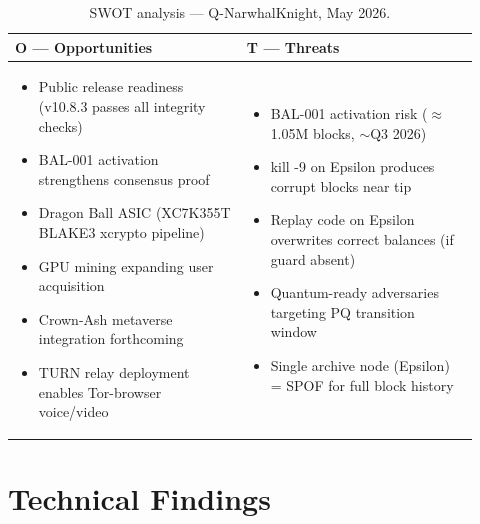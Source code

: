 \documentclass[12pt,a4paper]{article}
\begin{document}
\begin{table}[H]
\begin{tabular}{|p{0.46\linewidth}|p{0.46\linewidth}|}
\hline
\cellcolor{swotO}\textcolor{qblue}{\bfseries \large O — Opportunities} &
\cellcolor{swotT}\textcolor{qorange}{\bfseries \large T — Threats} \\
\hline
\begin{minipage}[t]{0.43\linewidth}\vspace{3pt}
\begin{itemize}[leftmargin=*,topsep=0pt,itemsep=1pt,parsep=0pt]
  \item Public release readiness (v10.8.3 passes all integrity checks)
  \item BAL-001 activation strengthens consensus proof
  \item Dragon Ball ASIC (XC7K355T BLAKE3 xcrypto pipeline)
  \item GPU mining expanding user acquisition
  \item Crown-Ash metaverse integration forthcoming
  \item TURN relay deployment enables Tor-browser voice/video
\end{itemize}\vspace{3pt}
\end{minipage} &
\begin{minipage}[t]{0.43\linewidth}\vspace{3pt}
\begin{itemize}[leftmargin=*,topsep=0pt,itemsep=1pt,parsep=0pt]
  \item BAL-001 activation risk ($\approx$1.05M blocks, $\sim$Q3 2026)
  \item kill -9 on Epsilon produces corrupt blocks near tip
  \item Replay code on Epsilon overwrites correct balances (if guard absent)
  \item Quantum-ready adversaries targeting PQ transition window
  \item Single archive node (Epsilon) = SPOF for full block history
\end{itemize}\vspace{3pt}
\end{minipage} \\
\hline
\end{tabular}
\caption{SWOT analysis — Q-NarwhalKnight, May 2026.}
\end{table}

\section{Technical Findings}
\end{document}
